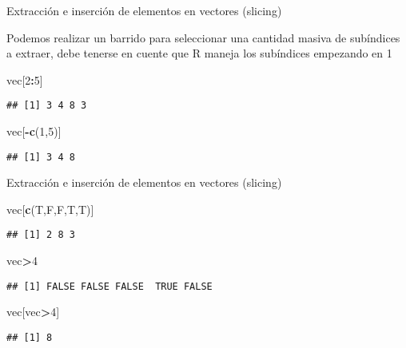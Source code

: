 \documentclass[ignorenonframetext,]{beamer}
\newenvironment{Shaded}{\begin{snugshade}}{\end{snugshade}}
\newcommand{\KeywordTok}[1]{\textcolor[rgb]{0.13,0.29,0.53}{\textbf{#1}}}
\newcommand{\DecValTok}[1]{\textcolor[rgb]{0.00,0.00,0.81}{#1}}
\newcommand{\OperatorTok}[1]{\textcolor[rgb]{0.81,0.36,0.00}{\textbf{#1}}}
\newcommand{\NormalTok}[1]{#1}
\begin{document}
\begin{frame}[fragile]{Extracción e inserción de elementos en vectores
(slicing)}

Podemos realizar un barrido para seleccionar una cantidad masiva de
subíndices a extraer, debe tenerse en cuente que R maneja los subíndices
empezando en 1

\begin{Shaded}
\begin{Highlighting}[]
\NormalTok{vec[}\DecValTok{2}\OperatorTok{:}\DecValTok{5}\NormalTok{]}
\end{Highlighting}
\end{Shaded}
\pause
\begin{verbatim}
## [1] 3 4 8 3
\end{verbatim}

\begin{Shaded}
\begin{Highlighting}[]
\NormalTok{vec[}\OperatorTok{-}\KeywordTok{c}\NormalTok{(}\DecValTok{1}\NormalTok{,}\DecValTok{5}\NormalTok{)]}
\end{Highlighting}
\end{Shaded}
\pause
\begin{verbatim}
## [1] 3 4 8
\end{verbatim}

\end{frame}

\begin{frame}[fragile]{Extracción e inserción de elementos en vectores
(slicing)}

\begin{Shaded}
\begin{Highlighting}[]
\NormalTok{vec[}\KeywordTok{c}\NormalTok{(T,F,F,T,T)]}
\end{Highlighting}
\end{Shaded}
\pause
\begin{verbatim}
## [1] 2 8 3
\end{verbatim}

\begin{Shaded}
\begin{Highlighting}[]
\NormalTok{vec}\OperatorTok{>}\DecValTok{4}
\end{Highlighting}
\end{Shaded}
\pause
\begin{verbatim}
## [1] FALSE FALSE FALSE  TRUE FALSE
\end{verbatim}

\begin{Shaded}
\begin{Highlighting}[]
\NormalTok{vec[vec}\OperatorTok{>}\DecValTok{4}\NormalTok{]}
\end{Highlighting}
\end{Shaded}
\pause
\begin{verbatim}
## [1] 8
\end{verbatim}

\end{frame}
\end{document}
